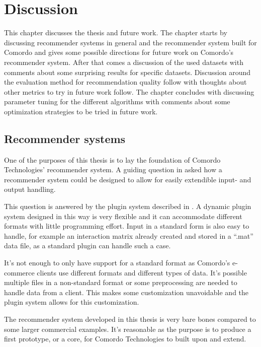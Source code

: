 \chapter{Discussion}\label{cha:discussion}

This chapter discusses the thesis and future work. The chapter starts by discussing recommender systems in general and the recommender system built for Comordo and gives some possible directions for future work on Comordo's recommender system. After that comes a discussion of the used datasets with comments about some surprising results for specific datasets. Discussion around the evaluation method for recommendation quality follow with thoughts about other metrics to try in future work follow. The chapter concludes with discussing parameter tuning for the different algorithms with comments about some optimization strategies to be tried in future work.


\section{Recommender systems}

One of the purposes of this thesis is to lay the foundation of Comordo Technologies' recommender system. A guiding question in  asked how a recommender system could be designed to allow for easily extendible input- and output handling.

This question is answered by the plugin system described in . A dynamic plugin system designed in this way is very flexible and it can accommodate different formats with little programming effort. Input in a standard form is also easy to handle, for example an interaction matrix already created and stored in a ``.mat'' data file, as a standard plugin can handle such a case.

It's not enough to only have support for a standard format as Comordo's e-commerce clients use different formats and different types of data. It's possible multiple files in a non-standard format or some preprocessing are needed to handle data from a client. This makes some customization unavoidable and the plugin system allows for this customization.

The recommender system developed in this thesis is very bare bones compared to some larger commercial examples. It's reasonable as the purpose is to produce a first prototype, or a core, for Comordo Technologies to built upon and extend.

